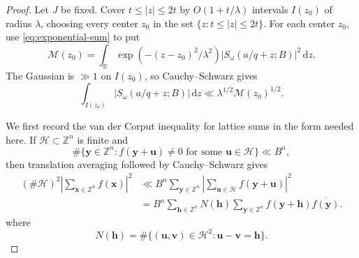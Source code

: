 \documentclass[reqno,a4paper,11pt]{amsart}
\numberwithin{equation}{section}
\newcommand{\ZZ}{\mathbb Z}
\newcommand{\RR}{\mathbb R}
\newcommand{\x}{\mathbf{x}}
\newcommand{\h}{\mathbf h}
\newcommand{\dint}{\,\mathrm d}
\theoremstyle{plain}
\theoremstyle{definition}
\begin{document}
\begin{proof}
Let \(J\) be fixed.
Cover \(t\leq|z|\leq2t\) by \(O(1+t/\lambda)\) intervals \(I(z_0)\) of radius \(\lambda\), choosing every center \(z_0\) in the set \(\{z:t\leq|z|\leq2t\}\).
For each center \(z_0\), use \eqref{eq:exponential-sum} to put
\[
 \mathcal M(z_0)=\int_{\RR}
 \exp(-(z-z_0)^2/\lambda^2)
 |S_\omega(a/q+z;B)|^2\dint z.
\]
The Gaussian is \(\gg 1\) on \(I(z_0)\), so Cauchy--Schwarz gives
\begin{equation}\label{eq:interval-cauchy}
 \int_{I(z_0)}|S_\omega(a/q+z;B)|\dint z
 \ll\lambda^{1/2}\mathcal M(z_0)^{1/2}.
\end{equation}

We first record the van der Corput inequality for lattice sums in the form needed here.
If \(\mathcal H\subset\ZZ^n\) is finite and
\[
 \#\{\mathbf y\in\ZZ^n:f(\mathbf y+\mathbf u)\neq0
 \text{ for some }\mathbf u\in\mathcal H\}\ll B^n,
\]
then translation averaging followed by Cauchy--Schwarz gives
\begin{equation}\label{eq:general-vdc}
 \begin{aligned}
 (\#\mathcal H)^2\left|\sum_{\x\in\ZZ^n}f(\x)\right|^2
 &\ll B^n\sum_{\mathbf y\in\ZZ^n}
 \left|\sum_{\mathbf u\in\mathcal H}f(\mathbf y+\mathbf u)\right|^2\\
 &=B^n\sum_{\h\in\ZZ^n}N(\h)
 \sum_{\mathbf y\in\ZZ^n}
 f(\mathbf y+\h)\overline{f(\mathbf y)}.
 \end{aligned}
\end{equation}
where
\[
 N(\h)=\#\{(\mathbf u,\mathbf v)\in\mathcal H^2: \mathbf u-\mathbf v=\h\}.
\]


\end{proof}
\end{document}

